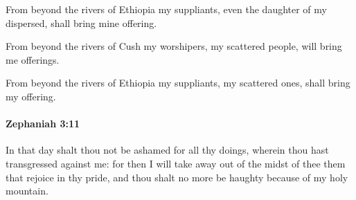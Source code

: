 			\begin{versebox}
					\item[BHS] 
					\item[LXX] 
					\item[ASV] From beyond the rivers of Ethiopia my suppliants, even the daughter of my dispersed, shall bring mine offering.
					\item[NIV] From beyond the rivers of Cush my worshipers, my scattered people, will bring me offerings.
					\item[NRSV] From beyond the rivers of Ethiopia my suppliants, my scattered ones, shall bring my offering.
			\end{versebox}

		\paragraph{Zephaniah 3:11} %
			\label{ZEPHANIAH-3-11}

			In that day shalt thou not be ashamed for all thy doings, wherein thou hast transgressed against me: for then I will take away out of the midst of thee them that rejoice in thy pride, and thou shalt no more be haughty because of my holy mountain.

